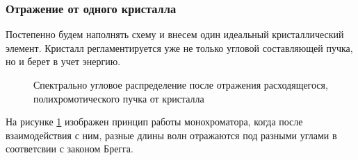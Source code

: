 \subsubsection{Отражение от одного кристалла}
  Постепенно будем наполнять схему и внесем один идеальный кристаллический элемент.
  Кристалл регламентируется уже не только угловой составляющей пучка, но и берет в учет энергию.
\begin{figure}[H]
  \centering
  \hfill

  \caption{Спектрально угловое распределение после отражения расходящегося, полихромотического пучка от кристалла}
  \label{ris:single_crystal_schem_lamtet}
\end{figure}

На рисунке \ref{ris:single_crystal_schem_lamtet} изображен принцип работы монохроматора,
когда после взаимодействия с ним, разные длины волн отражаются под разными углами в
соответсвии с законом Брегга.

